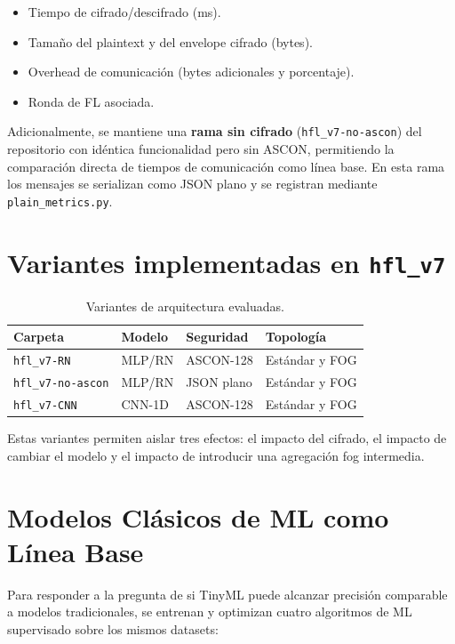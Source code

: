 \begin{itemize}
    \item Tiempo de cifrado/descifrado (ms).
    \item Tamaño del plaintext y del envelope cifrado (bytes).
    \item Overhead de comunicación (bytes adicionales y porcentaje).
    \item Ronda de FL asociada.
\end{itemize}

Adicionalmente, se mantiene una \textbf{rama sin cifrado} (\texttt{hfl\_v7-no-ascon}) del repositorio con idéntica funcionalidad pero sin ASCON, permitiendo la comparación directa de tiempos de comunicación como línea base. En esta rama los mensajes se serializan como JSON plano y se registran mediante \texttt{plain\_metrics.py}.

\section{Variantes implementadas en \texttt{hfl\_v7}}
\label{sec:variantes}

\begin{table}[H]
\centering
\caption{Variantes de arquitectura evaluadas.}
\label{tab:variantes_hfl}
\small
\begin{tabular}{l l l l}
\toprule
\textbf{Carpeta} & \textbf{Modelo} & \textbf{Seguridad} & \textbf{Topología} \\
\midrule
\texttt{hfl\_v7-RN} & MLP/RN & ASCON-128 & Estándar y FOG \\
\texttt{hfl\_v7-no-ascon} & MLP/RN & JSON plano & Estándar y FOG \\
\texttt{hfl\_v7-CNN} & CNN-1D & ASCON-128 & Estándar y FOG \\
\bottomrule
\end{tabular}
\end{table}

Estas variantes permiten aislar tres efectos: el impacto del cifrado, el impacto de cambiar el modelo y el impacto de introducir una agregación fog intermedia.

\section{Modelos Clásicos de ML como Línea Base}
\label{sec:ml_classic}

Para responder a la pregunta de si TinyML puede alcanzar precisión comparable a modelos tradicionales, se entrenan y optimizan cuatro algoritmos de ML supervisado sobre los mismos datasets:

